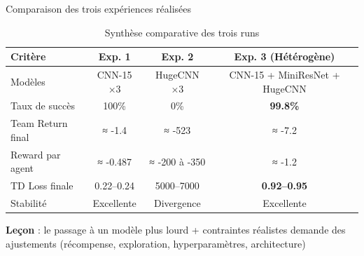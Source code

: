 \documentclass[aspectratio=169]{beamer}
\begin{document}
\begin{frame}{Comparaison des trois expériences réalisées}
\footnotesize
\begin{table}[]
\centering
\renewcommand{\arraystretch}{1.4}
\begin{tabular}{lccc}
\toprule
Critère                  & Exp. 1 & Exp. 2 & Exp. 3 (Hétérogène) \\
\midrule
Modèles                  & CNN-15 ×3                & HugeCNN ×3                & CNN-15 + MiniResNet + HugeCNN \\
Taux de succès           & 100\%                    & 0\%                       & \textbf{99.8\%} \\
Team Return final        & ≈ -1.4                 & ≈ -523               & ≈ -7.2 \\
Reward par agent         & ≈ -0.487                 & ≈ -200 à -350             & ≈ -1.2 \\
TD Loss finale           & 0.22–0.24                & 5000–7000                 & \textbf{0.92–0.95} \\
Stabilité                & Excellente               & Divergence                & Excellente \\
\bottomrule
\end{tabular}
\caption{Synthèse comparative des trois runs}
\end{table}

\centering
\textbf{Leçon} : le passage à un modèle plus lourd + contraintes réalistes demande des ajustements (récompense, exploration, hyperparamètres, architecture)
\end{frame}
\end{document}
